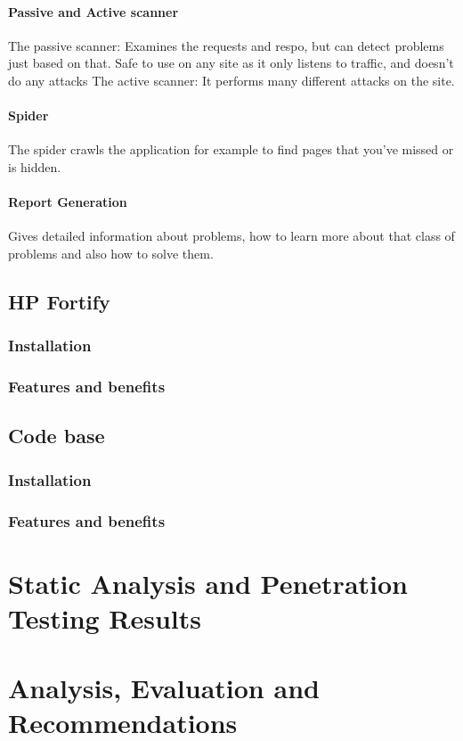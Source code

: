 \documentclass[11pt,english,a4paper]{report}
\begin{document}
\subsubsection{Passive and Active scanner}
The passive scanner: Examines the requests and respo, but can detect problems just based on that. Safe to use on any site as it only listens to traffic, and doesn't do any attacks
The active scanner: It performs many different attacks on the site.

\subsubsection{Spider}
The spider crawls the application for example to find pages that you've missed or is hidden.
\subsubsection{Report Generation}
Gives detailed information about problems, how to learn more about that class of problems and also how to solve them.

\section{HP Fortify}
\subsection{Installation}
\subsection{Features and benefits}
\section{Code base}
\subsection{Installation}
\subsection{Features and benefits}



\chapter{Static Analysis and Penetration Testing Results}
\chapter{Analysis, Evaluation and Recommendations}
\end{document}
